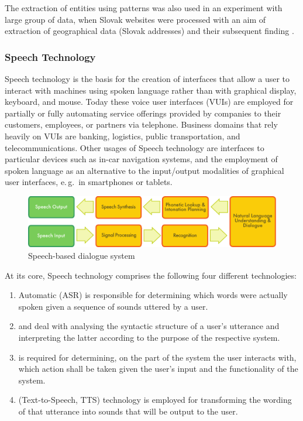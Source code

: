 \begin{multicols}{2}
The extraction of entities using patterns was also used in an experiment with large group of data, when Slovak websites were processed with an aim of extraction of geographical data (Slovak addresses) and their subsequent finding \cite{dlugolinsky2010}.

\subsubsection{Speech Technology}
Speech technology is the basis for the creation of interfaces that allow a user to interact with machines using spoken language rather than with graphical display, keyboard, and mouse. Today these voice user interfaces (VUIs) are employed for partially or fully automating service offerings provided by companies to their customers, employees, or partners via telephone. Business domains that rely heavily on VUIs are banking, logistics, public transportation, and telecommunications. Other usages of Speech technology are interfaces to particular devices such as in-car navigation systems, and the employment of spoken language as an alternative to the input/output modalities of graphical user interfaces, e.\,g.~in smartphones or tablets.

\begin{figure}[htb]
  \center
  \includegraphics[width=\textwidth]{../_media/english/simple_speech-based_dialogue_architecture}
  \caption{Speech-based dialogue system}
  \label{fig:dialoguearch_en}
\end{figure}

At its core, Speech technology comprises the following four different technologies:

\begin{enumerate}
\item Automatic  (ASR) is responsible for determining which words were actually spoken given a sequence of sounds uttered by a user.
\item {} and  deal with analysing the syntactic structure of a user’s utterance and interpreting the latter according to the purpose of the respective system.
\item {} is required for determining, on the part of the system the user interacts with, which action shall be taken given the user’s input and the functionality of the system.
\item {} (Text-to-Speech, TTS) technology is employed for transforming the wording of that utterance into  sounds that will be output to the user. 
\end{enumerate}


\end{multicols}
